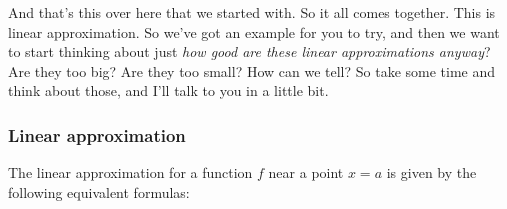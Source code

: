 \documentclass[pdftex, brazil, 12pt, twoside]{article}
\begin{document}
\begin{figure}[H]
  \begin{center}
  \end{center}
\end{figure}

And that's this over here that we started with.
So it all comes together.
This is linear approximation.
So we've got an example for you to try,
and then we want to start thinking
about just \emph{how good are these linear approximations anyway}?
Are they too big?
Are they too small?
How can we tell?
So take some time and think about those,
and I'll talk to you in a little bit.

\subsubsection{Linear approximation}
\label{u2-linear-linear-approximation-exerc}

The linear approximation for a function $f$ near a point $x=a$ is given by the
following equivalent formulas:

\begin{figure}[H]
  \begin{center}
  \end{center}
\end{figure}
\end{document}
